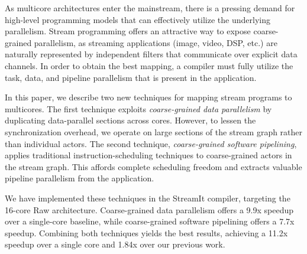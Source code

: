 As multicore architectures enter the mainstream, there is a pressing
demand for high-level programming models that can effectively utilize
the underlying parallelism.  Stream programming offers an attractive
way to expose coarse-grained parallelism, as streaming applications
(image, video, DSP, etc.) are naturally represented by independent
filters that communicate over explicit data channels.  In order to
obtain the best mapping, a compiler must fully utilize the task, data,
and pipeline parallelism that is present in the application.

In this paper, we describe two new techniques for mapping stream
programs to multicores.  The first technique exploits {\it
coarse-grained data parallelism} by duplicating data-parallel sections
across cores.  However, to lessen the synchronization overhead, we
operate on large sections of the stream graph rather than individual
actors.  The second technique, {\it coarse-grained software
pipelining}, applies traditional instruction-scheduling techniques to
coarse-grained actors in the stream graph.  This affords complete
scheduling freedom and extracts valuable pipeline parallelism from the
application.

We have implemented these techniques in the StreamIt compiler,
targeting the 16-core Raw architecture.  Coarse-grained data
parallelism offers a 9.9x speedup over a single-core baseline, while
coarse-grained software pipelining offers a 7.7x speedup.  Combining
both techniques yields the best results, achieving a 11.2x speedup over
a single core and 1.84x over our previous work.
